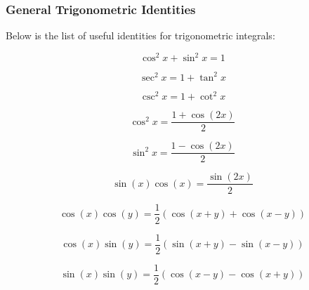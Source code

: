 \documentclass[a4paper,12pt]{article}
\begin{document}
\subsubsection{General Trigonometric Identities}
\begin{pst}
  Below is the list of useful identities for trigonometric integrals:

  \begin{alist}
    \item

    \begin{rlist}
      \item

      $$\cos^{2}x+\sin^{2}x=1$$

      \item

      $$\sec^{2}x=1+\tan^{2}x$$

      \item

      $$\csc^{2}x=1+\cot^{2}x$$
    \end{rlist}

    \item

    \begin{rlist}
      \item

      $$\cos^{2}x=\frac{1+\cos(2x)}{2}$$

      \item

      $$\sin^{2}x=\frac{1-\cos(2x)}{2}$$

      \item

      $$\sin(x)\cos(x)=\frac{\sin(2x)}{2}$$
    \end{rlist}

    \item

    \begin{rlist}
      \item

      $$\cos(x)\cos(y)=\frac{1}{2}(\cos(x+y)+\cos(x-y))$$

      \item

      $$\cos(x)\sin(y)=\frac{1}{2}(\sin(x+y)-\sin(x-y))$$

      \item

      $$\sin(x)\sin(y)=\frac{1}{2}(\cos(x-y)-\cos(x+y))$$
    \end{rlist}

  \end{alist}

\end{pst}
\end{document}
